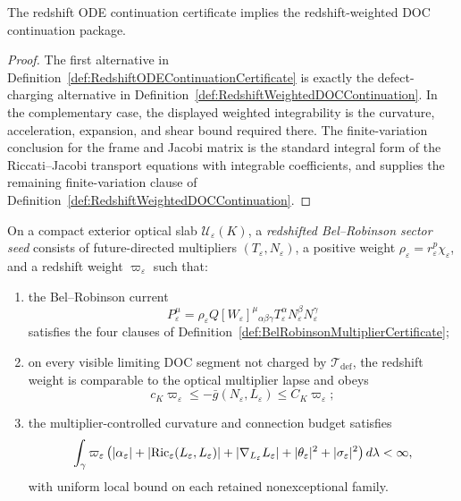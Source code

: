 \begin{proposition}\label{prop:RedshiftODECertificateGate}
The redshift ODE continuation certificate implies the redshift-weighted DOC continuation package.
\end{proposition}

\begin{proof}
The first alternative in Definition~\ref{def:RedshiftODEContinuationCertificate} is exactly the defect-charging alternative in Definition~\ref{def:RedshiftWeightedDOCContinuation}. In the complementary case, the displayed weighted integrability is the curvature, acceleration, expansion, and shear bound required there. The finite-variation conclusion for the frame and Jacobi matrix is the standard integral form of the Riccati--Jacobi transport equations with integrable coefficients, and supplies the remaining finite-variation clause of Definition~\ref{def:RedshiftWeightedDOCContinuation}.
\end{proof}

\begin{definition}\label{def:RedshiftedBelRobinsonSectorSeed}
On a compact exterior optical slab $\mathcal U_\varepsilon(K)$, a \emph{redshifted Bel--Robinson sector seed} consists of future-directed multipliers $(T_\varepsilon,N_\varepsilon)$, a positive weight $\rho_\varepsilon=r_\varepsilon^p\chi_\varepsilon$, and a redshift weight $\varpi_\varepsilon$ such that:
\begin{enumerate}
    \item the Bel--Robinson current
    \[
        P_\varepsilon^\mu
        =
        \rho_\varepsilon
        Q[W_\varepsilon]^\mu{}_{\alpha\beta\gamma}
        T_\varepsilon^\alpha N_\varepsilon^\beta N_\varepsilon^\gamma
    \]
    satisfies the four clauses of Definition~\ref{def:BelRobinsonMultiplierCertificate};
    \item on every visible limiting DOC segment not charged by $\mathcal T_{\mathrm{def}}$, the redshift weight is comparable to the optical multiplier lapse and obeys
    \[
        c_K\varpi_\varepsilon
        \le
        -\bar g(N_\varepsilon,L_\varepsilon)
        \le
        C_K\varpi_\varepsilon;
    \]
    \item the multiplier-controlled curvature and connection budget satisfies
    \[
        \int_\gamma
        \varpi_\varepsilon
        \left(
            |\alpha_\varepsilon|
            +
            |\mathrm{Ric}_\varepsilon(L_\varepsilon,L_\varepsilon)|
            +
            |\nabla_{L_\varepsilon}L_\varepsilon|
            +
            |\theta_\varepsilon|^2
            +
            |\sigma_\varepsilon|^2
        \right)d\lambda
        <\infty,
    \]
    with uniform local bound on each retained nonexceptional family.
\end{enumerate}
\end{definition}

